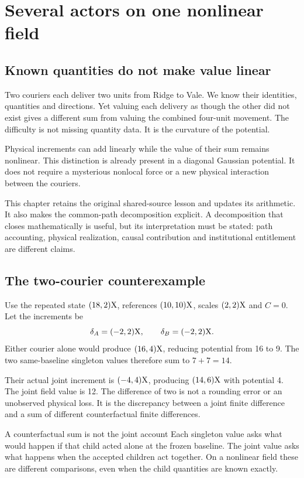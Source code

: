 \chapter{Several actors on one nonlinear field}\label{ch:groups}

\section{Known quantities do not make value linear}
Two couriers each deliver two units from Ridge to Vale. We know their identities, quantities and directions. Yet valuing each delivery as though the other did not exist gives a different sum from valuing the combined four-unit movement. The difficulty is not missing quantity data. It is the curvature of the potential.

Physical increments can add linearly while the value of their sum remains nonlinear. This distinction is already present in a diagonal Gaussian potential. It does not require a mysterious nonlocal force or a new physical interaction between the couriers.

This chapter retains the original shared-source lesson and updates its arithmetic. It also makes the common-path decomposition explicit. A decomposition that closes mathematically is useful, but its interpretation must be stated: path accounting, physical realization, causal contribution and institutional entitlement are different claims.

\section{The two-courier counterexample}
Use the repeated state $(18,2)\mathrm{X}$, references $(10,10)\mathrm{X}$, scales $(2,2)\mathrm{X}$ and $C=0$. Let the increments be
\[
 \delta_A=(-2,2)\mathrm{X},\qquad \delta_B=(-2,2)\mathrm{X}.
\]
Either courier alone would produce $(16,4)\mathrm{X}$, reducing potential from 16 to 9. The two same-baseline singleton values therefore sum to $7+7=14$.

Their actual joint increment is $(-4,4)\mathrm{X}$, producing $(14,6)\mathrm{X}$ with potential 4. The joint field value is 12. The difference of two is not a rounding error or an unobserved physical loss. It is the discrepancy between a joint finite difference and a sum of different counterfactual finite differences.

\begin{cautionbox}{A counterfactual sum is not the joint account}
Each singleton value asks what would happen if that child acted alone at the frozen baseline. The joint value asks what happens when the accepted children act together. On a nonlinear field these are different comparisons, even when the child quantities are known exactly.
\end{cautionbox}

